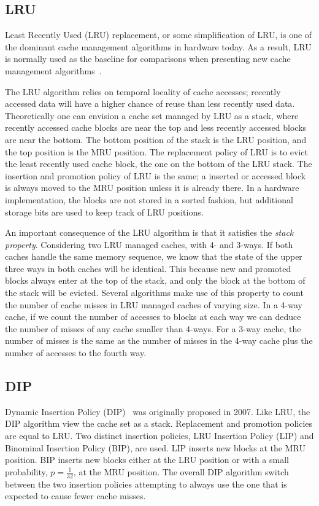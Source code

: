 \subsection{LRU}

Least Recently Used (LRU) replacement, or some simplification of LRU, is one of the dominant cache management algorithms in hardware today. 
As a result, LRU is normally used as the baseline for comparisons when presenting new cache management algorithms~\cite{Jaleel2010,Qureshi2006,Qureshi2007}.

The LRU algorithm relies on temporal locality of cache accesses; recently accessed data will have a higher chance of reuse than less recently used data.
Theoretically one can envision a cache set managed by LRU as a stack, where recently accessed cache blocks are near the top and less recently accessed blocks are near the bottom.
The bottom position of the stack is the LRU position, and the top position is the MRU position.
The replacement policy of LRU is to evict the least recently used cache block, the one on the bottom of the LRU stack.
The insertion and promotion policy of LRU is the same; a inserted or accessed block is always moved to the MRU position unless it is already there.
In a hardware implementation, the blocks are not stored in a sorted fashion, but additional storage bits are used to keep track of LRU positions.

An important consequence of the LRU algorithm is that it satisfies the \textit{stack property}.
Considering two LRU managed caches, with 4- and 3-ways.
If both caches handle the same memory sequence, we know that the state of the upper three ways in both caches will be identical.
This because new and promoted blocks always enter at the top of the stack, and only the block at the bottom of the stack will be evicted.
Several algorithms make use of this property to count the number of cache misses in LRU managed caches of varying size.
In a 4-way cache, if we count the number of accesses to blocks at each way we can deduce the number of misses of any cache smaller than 4-ways. 
For a 3-way cache, the number of misses is the same as the number of misses in the 4-way cache plus the number of accesses to the fourth way.

\subsection{DIP}

Dynamic Insertion Policy (DIP)~\cite{Qureshi2007} was originally proposed in 2007.
Like LRU, the DIP algorithm view the cache set as a stack.
Replacement and promotion policies are equal to LRU.
Two distinct insertion policies, LRU Insertion Policy (LIP) and Binominal Insertion Policy (BIP), are used.
LIP inserts new blocks at the MRU position.
BIP inserts new blocks either at the LRU position or with a small probability, $p = \frac{1}{32}$, at the MRU position. 
The overall DIP algorithm switch between the two insertion policies attempting to always use the one that is expected to cause fewer cache misses.

